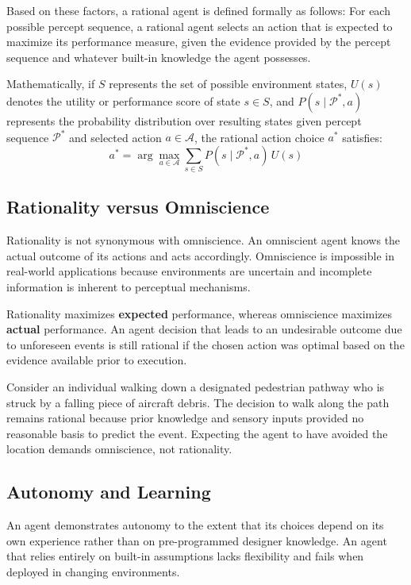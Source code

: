 \documentclass[12pt]{report}
\begin{document}
Based on these factors, a rational agent is defined formally as follows: For each possible percept sequence, a rational agent selects an action that is expected to maximize its performance measure, given the evidence provided by the percept sequence and whatever built-in knowledge the agent possesses.

Mathematically, if $S$ represents the set of possible environment states, $U(s)$ denotes the utility or performance score of state $s \in S$, and $P(s \mid \mathcal{P}^*, a)$ represents the probability distribution over resulting states given percept sequence $\mathcal{P}^*$ and selected action $a \in \mathcal{A}$, the rational action choice $a^*$ satisfies:
\begin{equation}
a^* = \arg\max_{a \in \mathcal{A}} \sum_{s \in S} P(s \mid \mathcal{P}^*, a) \, U(s)
\end{equation}

\subsection{Rationality versus Omniscience}

Rationality is not synonymous with omniscience. An omniscient agent knows the actual outcome of its actions and acts accordingly. Omniscience is impossible in real-world applications because environments are uncertain and incomplete information is inherent to perceptual mechanisms.

Rationality maximizes \textbf{expected} performance, whereas omniscience maximizes \textbf{actual} performance. An agent decision that leads to an undesirable outcome due to unforeseen events is still rational if the chosen action was optimal based on the evidence available prior to execution.

Consider an individual walking down a designated pedestrian pathway who is struck by a falling piece of aircraft debris. The decision to walk along the path remains rational because prior knowledge and sensory inputs provided no reasonable basis to predict the event. Expecting the agent to have avoided the location demands omniscience, not rationality.

\subsection{Autonomy and Learning}

An agent demonstrates autonomy to the extent that its choices depend on its own experience rather than on pre-programmed designer knowledge. An agent that relies entirely on built-in assumptions lacks flexibility and fails when deployed in changing environments.
\end{document}
